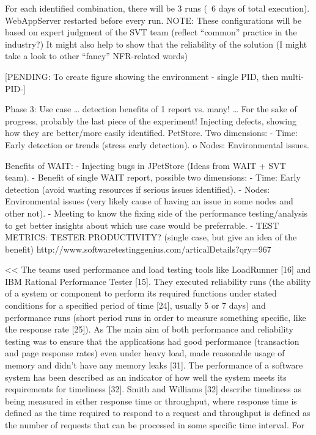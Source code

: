 \documentclass[runningheads,a4paper]{llncs}
\begin{document}
For each identified combination, there will be 3 runs (~6 days of total execution). WebAppServer restarted before every run.
NOTE: These configurations will be based on expert judgment of the SVT team (reflect “common” practice in the industry?)
It might also help to show that the reliability of the solution (I might take a look to other “fancy” NFR-related words)

[PENDING: To create figure showing the environment - single PID, then
multi-PID-]

Phase 3: 
Use case … detection benefits of 1 report vs. many! … For the sake of progress, probably the last piece of the experiment!
Injecting defects, showing how they are better/more easily identified. PetStore.
Two dimensions:
- Time: Early detection or trends (stress early detection).
o	Nodes: Environmental issues.

Benefits of WAIT:
- Injecting bugs in JPetStore (Ideas from WAIT + SVT team).
- Benefit of single WAIT report, possible two dimensions:
- Time: Early detection (avoid wasting resources if serious issues identified).
- Nodes: Environmental issues (very likely cause of having an issue in some nodes and other not).
- Meeting to know the fixing side of the performance testing/analysis to get better insights about which use case would be preferrable.
- TEST METRICS: TESTER PRODUCTIVITY? (single case, but give an idea of the benefit)
http://www.softwaretestinggenius.com/articalDetails?qry=967

<<
The teams used performance and load testing tools like
LoadRunner [16] and IBM Rational Performance Tester [15]. They executed reliability runs 
(the ability of a system or component to perform its required functions under stated 
conditions for a specified period of time [24], usually 5 or 7 days) and performance runs 
(short period runs in order to measure something specific, like the response rate [25]).
 As The main aim of both performance and reliability testing
was to ensure that the applications had good performance (transaction and page response rates) even under heavy load, made reasonable usage of memory and didn’t have any memory leaks [31]. The performance of a software system has been described as an indicator of how well the system meets its requirements for timeliness [32]. Smith and Williams [32] describe timeliness as being measured in either response time or throughput, where response time is defined as the time required to respond to a request and throughput is defined as the number of requests that can be processed in some specific time interval. For
\end{document}
